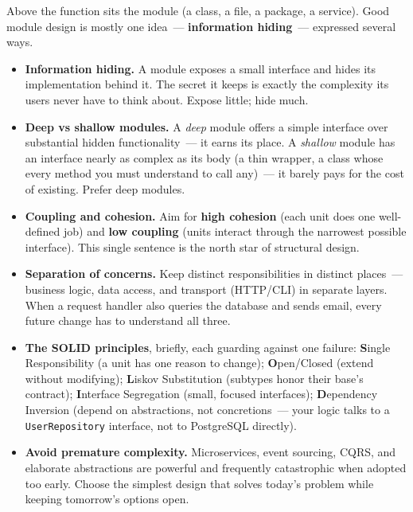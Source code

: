 \label{writing-good-code:modules-boundaries-and-design}

Above the function sits the module (a class, a file, a package, a service). Good module design is
mostly one idea~--- \textbf{information hiding}~--- expressed several ways.

\begin{itemize}
\tightlist
\item
  \textbf{Information hiding.} A module exposes a small interface and hides its implementation behind it.
  The secret it keeps is exactly the complexity its users never have to think about. Expose little;
  hide much.
\item
  \textbf{Deep vs shallow modules.} A \emph{deep} module offers a simple interface over substantial hidden
  functionality~--- it earns its place. A \emph{shallow} module has an interface nearly as complex as its
  body (a thin wrapper, a class whose every method you must understand to call any)~--- it barely pays
  for the cost of existing. Prefer deep modules.
\item
  \textbf{Coupling and cohesion.} Aim for \textbf{high cohesion} (each unit does one well-defined job) and
  \textbf{low coupling} (units interact through the narrowest possible interface). This single sentence is
  the north star of structural design.
\item
  \textbf{Separation of concerns.} Keep distinct responsibilities in distinct places~--- business logic,
  data access, and transport (HTTP/CLI) in separate layers. When a request handler also queries the
  database and sends email, every future change has to understand all three.
\item
  \textbf{The SOLID principles}, briefly, each guarding against one failure: \textbf{S}ingle Responsibility (a
  unit has one reason to change); \textbf{O}pen/Closed (extend without modifying); \textbf{L}iskov Substitution
  (subtypes honor their base's contract); \textbf{I}nterface Segregation (small, focused interfaces);
  \textbf{D}ependency Inversion (depend on abstractions, not concretions~--- your logic talks to a
  \texttt{UserRepository} interface, not to PostgreSQL directly).
\item
  \textbf{Avoid premature complexity.} Microservices, event sourcing, CQRS, and elaborate abstractions are
  powerful and frequently catastrophic when adopted too early. Choose the simplest design that solves
  today's problem while keeping tomorrow's options open.
\end{itemize}

